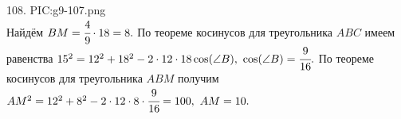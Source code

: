 108. {{PIC:g9-107.png}}\\
Найдём $BM=\cfrac{4}{9}\cdot18=8.$ По теореме косинусов для треугольника $ABC$ имеем равенства $15^2=12^2+18^2-2\cdot12\cdot18\cos(\angle B),\ \cos(\angle B)=\cfrac{9}{16}.$ По теореме косинусов для треугольника $ABM$ получим $AM^2=12^2+8^2-2\cdot12\cdot8\cdot\cfrac{9}{16}=100,\ AM=10.$\\
